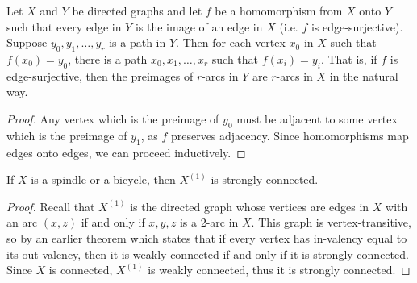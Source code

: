 \begin{lemma}
	Let $X$ and $Y$ be directed graphs and let $f$ be a homomorphism from $X$ onto $Y$ such that every edge in $Y$ is the image of an edge in $X$ (i.e. $f$ is edge-surjective).  Suppose $y_0,y_1,\dots,y_r$ is a path in $Y$.  Then for each vertex $x_0$ in $X$ such that $f(x_0)=y_0$, there is a path $x_0,x_1,\dots,x_r$ such that $f(x_i)=y_i$.  That is, if $f$ is edge-surjective, then the preimages of $r$-arcs in $Y$ are $r$-arcs in $X$ in the natural way.
\end{lemma}
\begin{proof}
	 Any vertex which is the preimage of $y_0$ must be adjacent to some vertex which is the preimage of $y_1$, as $f$ preserves adjacency.  Since homomorphisms map edges onto edges, we can proceed inductively.
\end{proof}
 \begin{lemma}
 	
 If $X$ is a spindle or a bicycle, then $X^{(1)}$ is strongly connected.
\end{lemma}
\begin{proof}
	Recall that $X^{(1)}$ is the directed graph whose vertices are edges in $X$ with an arc $(x,z)$ if and only if $x,y,z$ is a 2-arc in $X$.  This graph is vertex-transitive, so by an earlier theorem which states that if every vertex has in-valency equal to its out-valency, then it is weakly connected if and only if it is strongly connected.  Since $X$ is connected, $X^{(1)}$ is weakly connected, thus it is strongly connected.
\end{proof}

